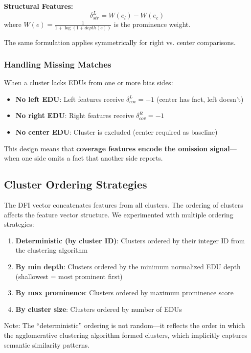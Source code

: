 \documentclass[11pt]{article}
\begin{document}
\textbf{Structural Features:}
\begin{equation}
\delta_{str}^{L} = W(e_l) - W(e_c)
\end{equation}
where $W(e) = \frac{1}{1 + \log(1 + depth(e))}$ is the prominence weight.

The same formulation applies symmetrically for right vs. center comparisons.

\subsubsection{Handling Missing Matches}

When a cluster lacks EDUs from one or more bias sides:
\begin{itemize}
    \item \textbf{No left EDU}: Left features receive $\delta_{cov}^L = -1$ (center has fact, left doesn't)
    \item \textbf{No right EDU}: Right features receive $\delta_{cov}^R = -1$
    \item \textbf{No center EDU}: Cluster is excluded (center required as baseline)
\end{itemize}

This design means that \textbf{coverage features encode the omission signal}---when one side omits a fact that another side reports.

\subsection{Cluster Ordering Strategies}

The DFI vector concatenates features from all clusters. The ordering of clusters affects the feature vector structure. We experimented with multiple ordering strategies:

\begin{enumerate}
    \item \textbf{Deterministic (by cluster ID)}: Clusters ordered by their integer ID from the clustering algorithm
    \item \textbf{By min depth}: Clusters ordered by the minimum normalized EDU depth (shallowest = most prominent first)
    \item \textbf{By max prominence}: Clusters ordered by maximum prominence score
    \item \textbf{By cluster size}: Clusters ordered by number of EDUs
\end{enumerate}

Note: The ``deterministic'' ordering is not random---it reflects the order in which the agglomerative clustering algorithm formed clusters, which implicitly captures semantic similarity patterns.
\end{document}
